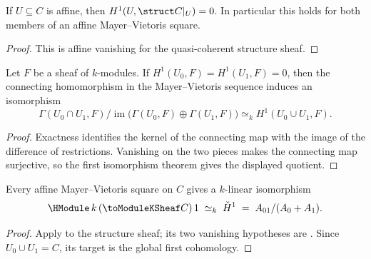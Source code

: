 \begin{proposition}
  \label{thm:adelic_affine_h1_vanishing}
  \leanok
  If \(U\subseteq C\) is affine, then
  \(H^1(U,\struct C|_U)=0\).  In particular this holds for both members
  of an affine Mayer--Vietoris square.
\end{proposition}
\begin{proof}
  \leanok
  This is affine vanishing for the quasi-coherent structure sheaf.
\end{proof}

\begin{proposition}
  \label{thm:adelic_mv_h1_cokernel_equiv}
  \leanok
  Let \(F\) be a sheaf of \(k\)-modules.  If
  \(H^1(U_0,F)=H^1(U_1,F)=0\), then the connecting homomorphism in the
  Mayer--Vietoris sequence induces an isomorphism
  \[
    \Gamma(U_0\cap U_1,F)/
      \operatorname{im}\bigl(\Gamma(U_0,F)\oplus\Gamma(U_1,F)\bigr)
      \simeq_k H^1(U_0\cup U_1,F).
  \]
\end{proposition}
\begin{proof}
  \leanok
  Exactness identifies the kernel of the connecting map with the image of
  the difference of restrictions.  Vanishing on the two pieces makes the
  connecting map surjective, so the first isomorphism theorem gives the
  displayed quotient.
\end{proof}

\begin{theorem}
  \label{thm:adelic_HModuleOne_linearEquiv_cokernel}
  \leanok
  Every affine Mayer--Vietoris square on \(C\) gives a \(k\)-linear
  isomorphism
  \[
    \HModule\, k\, (\toModuleKSheaf C)\, 1
    \;\simeq_k\; \check{H}^1 \;=\; A_{01}/(A_0 + A_1).
  \]
\end{theorem}
\begin{proof}
  \leanok
  Apply  to the structure sheaf;
  its two vanishing hypotheses are .
  Since \(U_0\cup U_1=C\), its target is the global first cohomology.
\end{proof}


